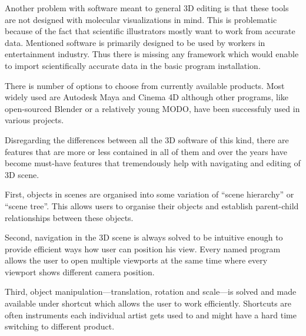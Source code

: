 \documentclass[
  digital, %
  table,   %
  nolof,     %
  nolot,     %
]{fithesis3}
\begin{document}
Another problem with software meant to general 3D editing is that these tools are not designed with molecular visualizations in mind. This is problematic because of the fact that scientific illustrators mostly want to work from accurate data. Mentioned software is primarily designed to be used by workers in entertainment industry. Thus there is missing any framework which would enable to import scientifically accurate data in the basic program installation.

There is number of options to choose from currently available products. Most widely used are Autodesk Maya and Cinema 4D although other programs, like open-sourced Blender or a relatively young MODO\cite{MODOscientificIll}, have been successfuly used in various projects.


Disregarding the differences between all the 3D software of this kind, there are features that are more or less contained in all of them and over the years have become must-have features that tremendously help with navigating and editing of 3D scene.

First, objects in scenes are organised into some variation of ``scene hierarchy'' or ``scene tree''. This allows users to organise their objects and establish parent-child relationships between these objects.

Second, navigation in the 3D scene is always solved to be intuitive enough to provide efficient ways how user can position his view. Every named program allows the user to open multiple viewports at the same time where every viewport shows different camera position.

Third, object manipulation—translation, rotation and scale—is solved and made available under shortcut which allows the user to work efficiently. Shortcuts are often instruments each individual artist gets used to and might have a hard time switching to different product.
\end{document}
